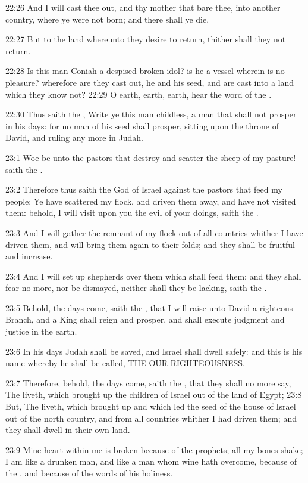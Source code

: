 22:26 And I will cast thee out, and thy mother that bare thee, into
another country, where ye were not born; and there shall ye die.

22:27 But to the land whereunto they desire to return, thither shall
they not return.

22:28 Is this man Coniah a despised broken idol? is he a vessel
wherein is no pleasure? wherefore are they cast out, he and his seed,
and are cast into a land which they know not?  22:29 O earth, earth,
earth, hear the word of the \LORD.

22:30 Thus saith the \LORD, Write ye this man childless, a man that
shall not prosper in his days: for no man of his seed shall prosper,
sitting upon the throne of David, and ruling any more in Judah.

23:1 Woe be unto the pastors that destroy and scatter the sheep of my
pasture! saith the \LORD.

23:2 Therefore thus saith the \LORD God of Israel against the pastors
that feed my people; Ye have scattered my flock, and driven them away,
and have not visited them: behold, I will visit upon you the evil of
your doings, saith the \LORD.

23:3 And I will gather the remnant of my flock out of all countries
whither I have driven them, and will bring them again to their folds;
and they shall be fruitful and increase.

23:4 And I will set up shepherds over them which shall feed them: and
they shall fear no more, nor be dismayed, neither shall they be
lacking, saith the \LORD.

23:5 Behold, the days come, saith the \LORD, that I will raise unto
David a righteous Branch, and a King shall reign and prosper, and
shall execute judgment and justice in the earth.

23:6 In his days Judah shall be saved, and Israel shall dwell safely:
and this is his name whereby he shall be called, THE \LORD OUR
RIGHTEOUSNESS.

23:7 Therefore, behold, the days come, saith the \LORD, that they shall
no more say, The \LORD liveth, which brought up the children of Israel
out of the land of Egypt; 23:8 But, The \LORD liveth, which brought up
and which led the seed of the house of Israel out of the north
country, and from all countries whither I had driven them; and they
shall dwell in their own land.

23:9 Mine heart within me is broken because of the prophets; all my
bones shake; I am like a drunken man, and like a man whom wine hath
overcome, because of the \LORD, and because of the words of his
holiness.

